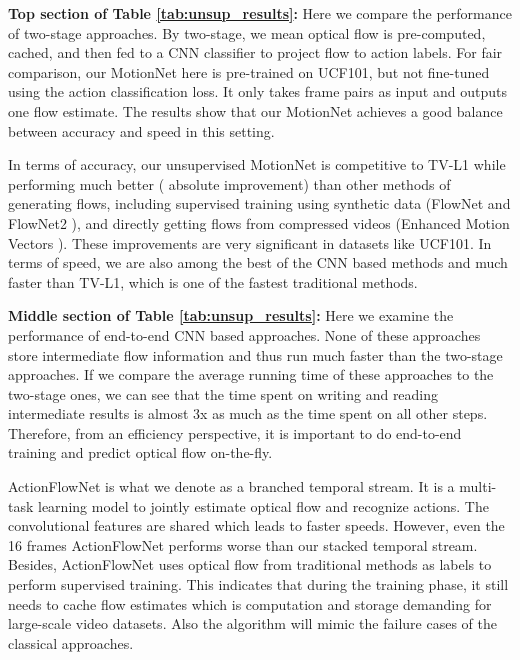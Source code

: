 \documentclass[runningheads]{llncs}
\begin{document}
		\noindent \textbf{Top section of Table \ref{tab:unsup_results}:} Here we compare the performance of two-stage approaches. {\color{black}By two-stage, we mean optical flow is pre-computed, cached, and then fed to a CNN classifier to project flow to action labels. For fair comparison, our MotionNet here is pre-trained on UCF101, but not fine-tuned using the action classification loss. It only takes frame pairs as input and outputs one flow estimate.}
		The results show that our MotionNet achieves a good balance between accuracy and speed in this setting. 
		
		In terms of accuracy, our unsupervised MotionNet is competitive to TV-L1 while performing much better ( absolute improvement) than other methods of generating flows, including supervised training using synthetic data (FlowNet \cite{flownet} and FlowNet2 \cite{flownet2}), and directly getting flows from compressed videos (Enhanced Motion Vectors \cite{EMV_cvpr16}). These improvements are very significant in datasets like UCF101. 
		In terms of speed, we are also among the best of the CNN based methods and much faster than TV-L1, which is one of the fastest traditional methods.   
		


		\noindent  \textbf{Middle section of Table \ref{tab:unsup_results}:} Here we examine the performance of end-to-end CNN based approaches. None of these approaches store intermediate flow information and thus run much faster than the two-stage approaches. If we compare the average running time of these approaches to the two-stage ones, we can see that the time spent on writing and reading intermediate results is almost 3x as much as the time spent on all other steps. Therefore, from an efficiency perspective, it is important to do end-to-end training and predict optical flow on-the-fly. 
		
		ActionFlowNet \cite{actionflownet_16} is what we denote as a branched temporal stream. It is a multi-task learning model to jointly estimate optical flow and recognize actions. The convolutional features are shared which leads to faster speeds. However, even the 16 frames ActionFlowNet performs  worse than our stacked temporal stream. Besides, ActionFlowNet uses optical flow from traditional methods as labels to perform supervised training. This indicates that during the training phase, it still needs to cache flow estimates which is computation and storage demanding for large-scale video datasets. Also the algorithm will mimic the failure cases of the classical approaches. 
		
\end{document}

